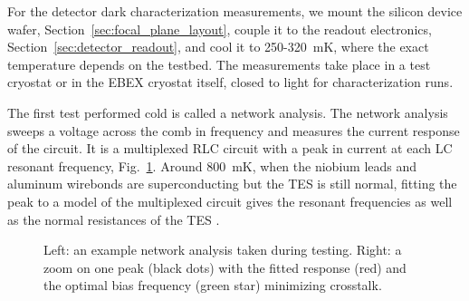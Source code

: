 For the detector dark characterization measurements, we mount the silicon device wafer, Section~\ref{sec:focal_plane_layout}, couple it to the readout electronics, Section~\ref{sec:detector_readout}, and cool it to 250-320~mK, where the exact temperature depends on the testbed. 
The measurements take place in a test cryostat or in the \ac{EBEX} cryostat itself, closed to light for characterization runs. %

The first test performed cold is called a network analysis. 
The network analysis sweeps a voltage across the comb in frequency and measures the current response of the circuit. 
It is a multiplexed RLC circuit with a peak in current at each LC resonant frequency, Fig.~\ref{fig:network_analysis}. 
Around 800~mK, when the niobium leads and aluminum wirebonds are superconducting but the TES is still normal, fitting the peak to a model of the multiplexed circuit gives the resonant frequencies as well as the normal resistances of the TES \citep{MacDermid_thesis}. 


\begin{figure}[htbp]
\begin{center}
\caption{Left: an example network analysis taken during testing.
Right: a zoom on one peak (black dots) with the fitted response (red) and the optimal bias frequency (green star) minimizing crosstalk.}
\label{fig:network_analysis}
\end{center}
\end{figure}

